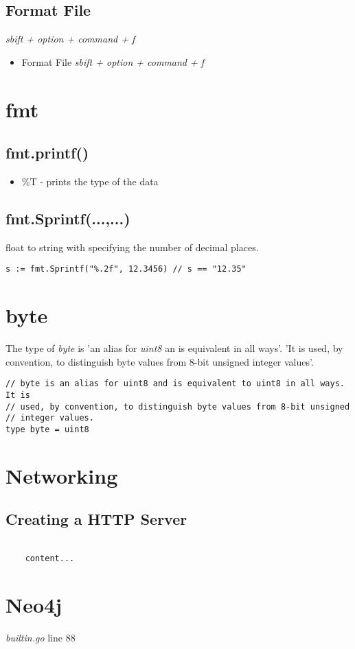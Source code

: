 \documentclass[]{article}
\renewcommand{\it}[1]{\textit{#1}}
\begin{document}
\subsection{Format File}
\it{sbift + option + command + f}
\begin{itemize}
	\item Format File
	\subitem \it{sbift + option + command + f}
\end{itemize}

\section{fmt}
\subsection{fmt.printf()}
\begin{itemize}
	\item \%T - prints the type of the data 
\end{itemize}

\subsection{fmt.Sprintf(...,...)}
float to string with specifying the number of decimal places.
\begin{lstlisting}
s := fmt.Sprintf("%.2f", 12.3456) // s == "12.35"
\end{lstlisting}


\section{byte}
The type of \it{byte} is 'an alias for \it{uint8} an is equivalent in all ways'. 'It is used, by convention, to distinguish byte values from 8-bit unsigned integer values'.
\begin{lstlisting}
// byte is an alias for uint8 and is equivalent to uint8 in all ways. It is
// used, by convention, to distinguish byte values from 8-bit unsigned
// integer values.
type byte = uint8
\end{lstlisting}\cite{byte-definition}

\section{Networking}

\subsection{Creating a HTTP Server}
\begin{lstlisting}

	content...
\end{lstlisting}



\section{Neo4j}

\begin{thebibliography}{99}
	
	\it{builtin.go} line 88
	
\end{thebibliography}
\end{document}
